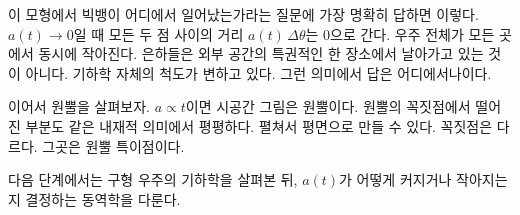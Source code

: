 이 모형에서 빅뱅이 어디에서 일어났는가라는 질문에 가장 명확히 답하면 이렇다. \(a(t)\to 0\)일 때 모든 두 점 사이의 거리 \(a(t)\,\Delta\theta\)는 0으로 간다. 우주 전체가 모든 곳에서 동시에 작아진다. 은하들은 외부 공간의 특권적인 한 장소에서 날아가고 있는 것이 아니다. 기하학 자체의 척도가 변하고 있다. 그런 의미에서 답은 어디에서나이다.

\begin{classroomqa}\end{classroomqa}

이어서 원뿔을 살펴보자. \(a\propto t\)이면 시공간 그림은 원뿔이다. 원뿔의 꼭짓점에서 떨어진 부분도 같은 내재적 의미에서 평평하다. 펼쳐서 평면으로 만들 수 있다. 꼭짓점은 다르다. 그곳은 원뿔 특이점이다.

다음 단계에서는 구형 우주의 기하학을 살펴본 뒤, \(a(t)\)가 어떻게 커지거나 작아지는지 결정하는 동역학을 다룬다.